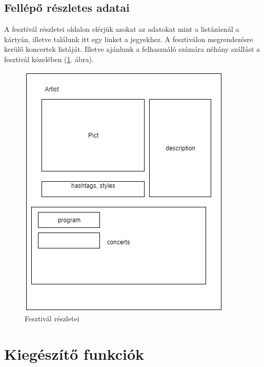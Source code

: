 \subsection{Fellépő részletes adatai}

A fesztivál részletei oldalon elérjük azokat az adatokat mint a listázásnál a kártyán, illetve találunk itt egy linket a jegyekhez. A fesztiválon megrendezésre kerülő koncertek listáját. Illetve ajánlunk a felhasználó számára néhány szállást a fesztivál közelében (\ref{fig:artist_details}. ábra).

\begin{figure}
\centering
\includegraphics[scale=0.5]{kepek/artist_details.jpg}
\caption{Fesztivál részletei}
\label{fig:artist_details}
\end{figure}

\section{Kiegészítő funkciók}

